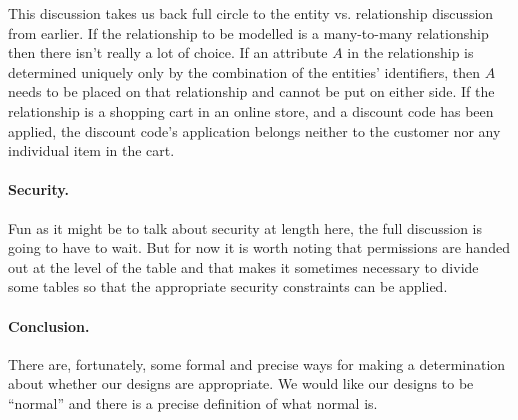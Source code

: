 This discussion takes us back full circle to the entity vs. relationship discussion from earlier. If the relationship to be modelled is a many-to-many relationship then there isn't really a lot of choice. If an attribute $A$ in the relationship is determined uniquely only by the combination of the entities' identifiers, then $A$ needs to be placed on that relationship and cannot be put on either side. If the relationship is a shopping cart in an online store, and a discount code has been applied, the discount code's application belongs neither to the customer nor any individual item in the cart.

\paragraph{Security.} Fun as it might be to talk about security at length here, the full discussion is going to have to wait. But for now it is worth noting that permissions are handed out at the level of the table and that makes it sometimes necessary to divide some tables so that the appropriate security constraints can be applied. 

\paragraph{Conclusion.} There are, fortunately, some formal and precise ways for making a determination about whether our designs are appropriate. We would like our designs to be ``normal'' and there is a precise definition of what normal is. 




